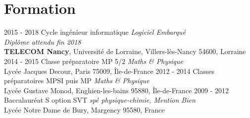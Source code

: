\documentclass[letterpaper]{twentysecondcv} %
\begin{document}
\makeprofile %

\vspace{-0.40cm} %

\section{Formation}
\vspace{-0.1cm}
\begin{twenty}  

    
	\twentyitem
    	{2015 - 2018}
        {}
        {Cycle ingénieur informatique \textnormal{ \textit{Logiciel Embarqué}}\\\textnormal{ \textit{ Diplôme attendu fin 2018}}}
        {\\\textbf{TELECOM Nancy}, Université de Lorraine, Villers-lès-Nancy 54600, Lorraine}
        {}
        {}
	\twentyitem
    	{2014 - 2015}
		{}
        {Classe préparatoire MP 5/2 \textnormal{\textit{ Maths \& Physique}}}
        {\\Lycée Jacques Decour, Paris 75009, Île-de-France}
        {}
        {}
	\twentyitem
    	{2012 - 2014}
		{}
        {Classes préparatoires MPSI puis MP \textnormal{\textit{ Maths \& Physique}}}
        {\\Lycée Gustave Monod, Enghien-les-bains 95880, Île-de-France}
        {}
        {}
	\twentyitem
    	{2009 - 2012}
		{}
        {Baccalauréat S option SVT \textnormal{ \textit{spé physique-chimie, Mention Bien}}}
        {\\Lycée Notre Dame de Bury, Margency 95580, France}
        {}
        {}
\end{twenty}

\end{document}

